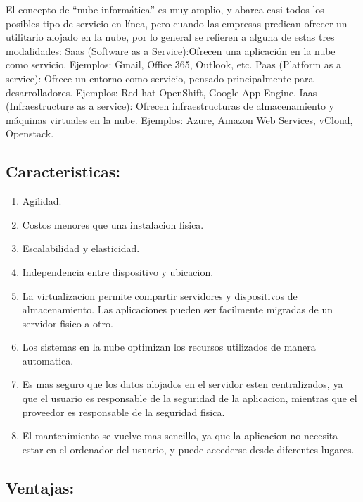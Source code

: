 \documentclass[12pt,letterpaper]{article}
\begin{document}
El concepto de “nube informática” es muy amplio, y abarca casi todos los posibles tipo de servicio en línea, pero cuando las empresas predican ofrecer un utilitario alojado en la nube, por lo general se refieren a alguna de estas tres modalidades:
Saas (Software as a Service):Ofrecen una aplicación en la nube como servicio. Ejemplos: Gmail, Office 365, Outlook, etc.
Paas (Platform as a service): Ofrece un entorno como servicio, pensado principalmente para desarrolladores. Ejemplos: Red hat OpenShift, Google App Engine.
Iaas (Infraestructure as a service): Ofrecen infraestructuras de almacenamiento y máquinas virtuales en la nube. Ejemplos: Azure, Amazon Web Services, vCloud, Openstack.


\subsection{Caracteristicas:}
\begin{enumerate}
\item Agilidad.
\item Costos menores que una instalacion fisica.
\item Escalabilidad y elasticidad.
\item Independencia entre dispositivo y ubicacion.
\item La virtualizacion permite compartir servidores y dispositivos de almacenamiento. Las aplicaciones pueden ser facilmente migradas de un servidor fisico a otro.
\item Los sistemas en la nube optimizan los recursos utilizados de manera automatica.
\item Es mas seguro que los datos alojados en el servidor esten centralizados, ya que el usuario es responsable de la seguridad de la aplicacion, mientras que el proveedor es responsable de la seguridad fisica.
\item El mantenimiento se vuelve mas sencillo, ya que la aplicacion no necesita estar en el ordenador del usuario, y puede accederse desde diferentes lugares.
\end{enumerate}

\subsection{Ventajas:}
\end{document}
